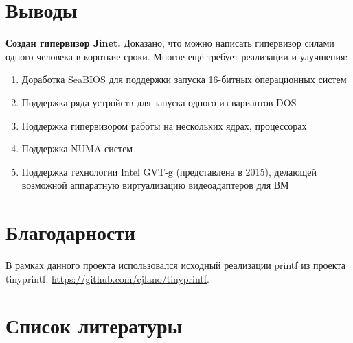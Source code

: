 \documentclass[a4paper,12pt]{extarticle}
\begin{document}
	\section{Выводы}
	\textbf{Создан гипервизор Jinet.} Доказано, что можно написать гипервизор силами одного человека в короткие сроки. Многое ещё требует реализации и улучшения:
	\begin{enumerate}
		\item Доработка SeaBIOS для поддержки запуска 16-битных операционных систем
		\item Поддержка ряда устройств для запуска одного из вариантов DOS
		\item Поддержка гипервизором работы на нескольких ядрах, процессорах
		\item Поддержка NUMA-систем
		\item Поддержка технологии Intel GVT-g (представлена в 2015), делающей возможной аппаратную виртуализацию видеоадаптеров для ВМ
	\end{enumerate}
	\pagebreak
\section{Благодарности}
	В рамках данного проекта использовался исходный реализации printf из проекта tinyprintf: \url{https://github.com/cjlano/tinyprintf}.
\section{Список литературы}
\nocite{*}
\renewcommand{\section}[2]{}%


\end{document}
